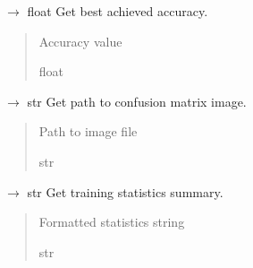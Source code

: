\documentclass[letterpaper,10pt,english]{sphinxmanual}
\begin{document}

\begin{fulllineitems}
\label{\detokenize{autoapi/src/RNNTrainer/index:src.RNNTrainer.get_best_acc}}
\pysigstartsignatures
\pysiglinewithargsret
{}
{}
{{ $\rightarrow$ float}}
\pysigstopsignatures
\sphinxAtStartPar
Get best achieved accuracy.
\begin{quote}\begin{description}
\sphinxAtStartPar
Accuracy value

\sphinxAtStartPar
float

\end{description}\end{quote}

\end{fulllineitems}


\begin{fulllineitems}
\label{\detokenize{autoapi/src/RNNTrainer/index:src.RNNTrainer.get_confusion_matrix}}
\pysigstartsignatures
\pysiglinewithargsret
{}
{}
{{ $\rightarrow$ str}}
\pysigstopsignatures
\sphinxAtStartPar
Get path to confusion matrix image.
\begin{quote}\begin{description}
\sphinxAtStartPar
Path to image file

\sphinxAtStartPar
str

\end{description}\end{quote}

\end{fulllineitems}


\begin{fulllineitems}
\label{\detokenize{autoapi/src/RNNTrainer/index:src.RNNTrainer.stats}}
\pysigstartsignatures
\pysiglinewithargsret
{}
{}
{{ $\rightarrow$ str}}
\pysigstopsignatures
\sphinxAtStartPar
Get training statistics summary.
\begin{quote}\begin{description}
\sphinxAtStartPar
Formatted statistics string

\sphinxAtStartPar
str

\end{description}\end{quote}

\end{fulllineitems}
\end{document}
